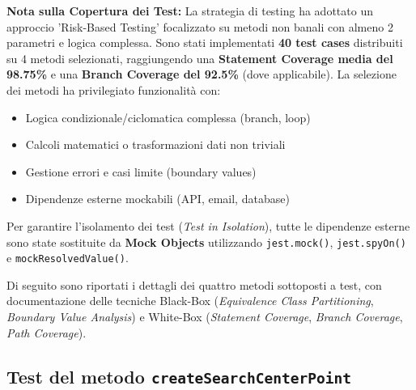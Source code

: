 \textbf{Nota sulla Copertura dei Test:} La strategia di testing ha adottato un approccio 'Risk-Based Testing' focalizzato su metodi non banali con almeno 2 parametri e logica complessa. Sono stati implementati \textbf{40 test cases} distribuiti su 4 metodi selezionati, raggiungendo una \textbf{Statement Coverage media del 98.75\%} e una \textbf{Branch Coverage del 92.5\%} (dove applicabile). La selezione dei metodi ha privilegiato funzionalità con:
\begin{itemize}
    \item Logica condizionale/ciclomatica complessa (branch, loop)
    \item Calcoli matematici o trasformazioni dati non triviali
    \item Gestione errori e casi limite (boundary values)
    \item Dipendenze esterne mockabili (API, email, database)
\end{itemize}

Per garantire l'isolamento dei test (\textit{Test in Isolation}), tutte le dipendenze esterne sono state sostituite da \textbf{Mock Objects} utilizzando \texttt{jest.mock()}, \texttt{jest.spyOn()} e \texttt{mockResolvedValue()}.

Di seguito sono riportati i dettagli dei quattro metodi sottoposti a test, con documentazione delle tecniche Black-Box (\textit{Equivalence Class Partitioning}, \textit{Boundary Value Analysis}) e White-Box (\textit{Statement Coverage}, \textit{Branch Coverage}, \textit{Path Coverage}).

\subsection{Test del metodo \texttt{createSearchCenterPoint}}

